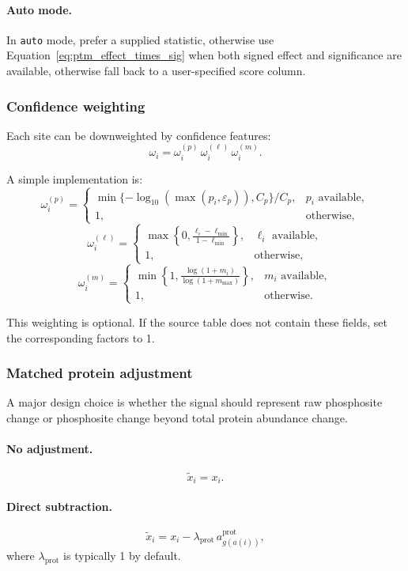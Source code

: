 \documentclass[11pt]{article}
\begin{document}
\paragraph{Auto mode.}
In \texttt{auto} mode, prefer a supplied statistic, otherwise use
Equation~\eqref{eq:ptm_effect_times_sig} when both signed effect and
significance are available, otherwise fall back to a user-specified score
column.

\subsubsection{Confidence weighting}
Each site can be downweighted by confidence features:
\[
\omega_i = \omega_i^{(p)} \, \omega_i^{(\ell)} \, \omega_i^{(m)}.
\]

A simple implementation is:
\[
\omega_i^{(p)} =
\begin{cases}
\min\{-\log_{10}(\max(p_i,\varepsilon_p)), C_p\}/C_p, & p_i \text{ available},\\
1, & \text{otherwise},
\end{cases}
\]
\[
\omega_i^{(\ell)} =
\begin{cases}
\max\left\{0, \frac{\ell_i - \ell_{\min}}{1-\ell_{\min}}\right\}, &
\ell_i \text{ available},\\
1, & \text{otherwise},
\end{cases}
\]
\[
\omega_i^{(m)} =
\begin{cases}
\min\left\{1, \frac{\log(1+m_i)}{\log(1+m_{\max})}\right\}, &
m_i \text{ available},\\
1, & \text{otherwise}.
\end{cases}
\]

This weighting is optional. If the source table does not contain these fields,
set the corresponding factors to 1.

\subsubsection{Matched protein adjustment}
A major design choice is whether the signal should represent raw phosphosite
change or phosphosite change beyond total protein abundance change.

\paragraph{No adjustment.}
\[
\widetilde{x}_i = x_i.
\]

\paragraph{Direct subtraction.}
\begin{equation}
\widetilde{x}_i = x_i - \lambda_{\mathrm{prot}} \,
a_{g(a(i))}^{\mathrm{prot}},
\label{eq:ptm_protein_subtract}
\end{equation}
where $\lambda_{\mathrm{prot}}$ is typically 1 by default.
\end{document}

